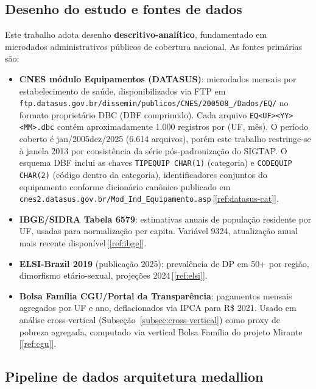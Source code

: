\documentclass[12pt,a4paper,oneside]{article}
\begin{document}
\subsection{Desenho do estudo e fontes de dados}

Este trabalho adota desenho \textbf{descritivo-analítico},
fundamentado em microdados administrativos públicos de cobertura
nacional. As fontes primárias são:

\begin{itemize}
\item \textbf{CNES \textendash{} módulo Equipamentos (DATASUS)}:
microdados mensais por estabelecimento de saúde, disponibilizados
via FTP em
\texttt{ftp.datasus.gov.br/dissemin/publicos/CNES/200508\_/Dados/EQ/}
no formato proprietário DBC (DBF comprimido). Cada arquivo
\texttt{EQ<UF><YY><MM>.dbc} contém aproximadamente 1.000
registros por (UF, mês). O período coberto é jan/2005\textendash dez/2025
(6.614 arquivos), porém este trabalho restringe-se à janela
2013 por consistência da série pós-padronização do
SIGTAP. O esquema DBF inclui as chaves \texttt{TIPEQUIP CHAR(1)}
(categoria) e \texttt{CODEQUIP CHAR(2)} (código dentro da categoria),
identificadores conjuntos do equipamento conforme dicionário
canônico publicado em
\texttt{cnes2.datasus.gov.br/Mod\_Ind\_Equipamento.asp}\,[\ref{ref:datasus-cat}].

\item \textbf{IBGE/SIDRA \textendash{} Tabela 6579}: estimativas
anuais de população residente por UF, usadas para normalização per
capita. Variável 9324, atualização anual mais recente
disponível\,[\ref{ref:ibge}].

\item \textbf{ELSI-Brazil 2019} (publicação 2025):
prevalência de DP em 50+ por região, dimorfismo etário-sexual,
projeções 2024\,[\ref{ref:elsi}].

\item \textbf{Bolsa Família \textendash{} CGU/Portal da Transparência}:
pagamentos mensais agregados por UF e ano, deflacionados via IPCA
para R\$ 2021. Usado em análise cross-vertical
(Subseção~\ref{subsec:cross-vertical}) como proxy de pobreza
agregada, computado via vertical Bolsa Família do projeto
Mirante\,[\ref{ref:cgu}].
\end{itemize}

\subsection{Pipeline de dados \textendash{} arquitetura medallion}
\end{document}
